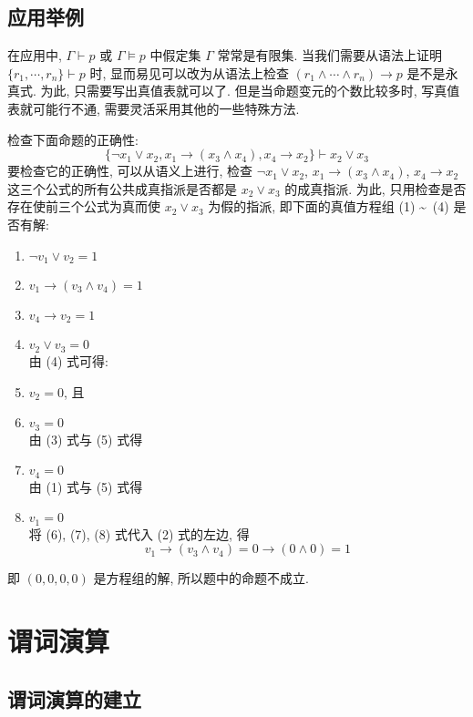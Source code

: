 \documentclass[
    color=black,
    device=normal,
    lang=cn
]{elegantnote}
\begin{document}
\subsection{应用举例}
在应用中, $\Gamma\vdash p$ 或 $\Gamma\vDash p$ 中假定集 $\Gamma$ 常常是有限集. 当我们需要从语法上证明 $\{r_1,\cdots,r_n\}\vdash p$ 时, 显而易见可以改为从语法上检查 $(r_1\land\cdots\land r_n)\to p$ 是不是永真式. 为此, 只需要写出真值表就可以了. 但是当命题变元的个数比较多时, 写真值表就可能行不通, 需要灵活采用其他的一些特殊方法.
\begin{example}
    检查下面命题的正确性:
    $$
        \{\lnot x_1\lor x_2,x_1\to (x_3\land x_4), x_4\to x_2\}\vdash x_2\lor x_3
    $$
    要检查它的正确性, 可以从语义上进行, 检查 $\lnot x_1\lor x_2$, $x_1\to (x_3\land x_4)$, $x_4\to x_2$ 这三个公式的所有公共成真指派是否都是 $x_2\lor x_3$ 的成真指派. 为此, 只用检查是否存在使前三个公式为真而使 $x_2\lor x_3$ 为假的指派, 即下面的真值方程组 (1) \textasciitilde \ (4) 是否有解:
    \begin{enumerate}[label = (\arabic*), listparindent = 2em, topsep = -1em]
        \item $\lnot v_1\lor v_2 = 1$
        \item $v_1\to (v_3\land v_4) = 1$
        \item $v_4\to v_2 = 1$
        \item $v_2\lor v_3 = 0$\\
              由 (4) 式可得:
        \item $v_2 = 0$, 且
        \item $v_3 = 0$\\
              由 (3) 式与 (5) 式得
        \item $v_4 = 0$\\
              由 (1) 式与 (5) 式得
        \item $v_1 = 0$\\
              将 (6), (7), (8) 式代入 (2) 式的左边, 得
              $$
                  v_1 \to (v_3\land v_4) = 0\to (0\land 0) = 1
              $$
    \end{enumerate}
    即 $(0,0,0,0)$ 是方程组的解, 所以题中的命题不成立.
\end{example}
\newpage
\section{谓词演算}
\subsection{谓词演算的建立}
\end{document}
